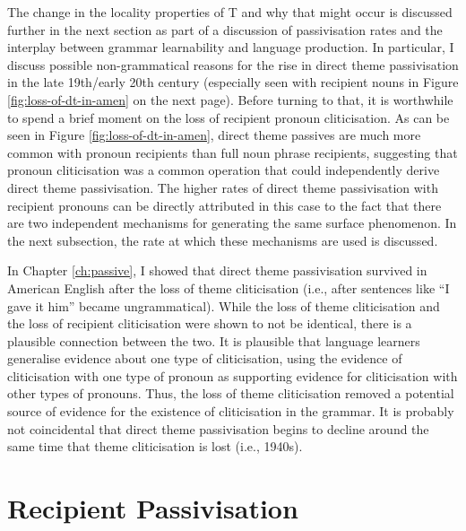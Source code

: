 	The change in the locality properties of T and why that might occur is discussed further in the next section as part of a discussion of passivisation rates and the interplay between grammar learnability and language production. In particular, I discuss possible non-grammatical reasons for the rise in direct theme passivisation in the late 19th/early 20th century (especially seen with recipient nouns in Figure \ref{fig:loss-of-dt-in-amen} on the next page). Before turning to that, it is worthwhile to spend a brief moment on the loss of recipient pronoun cliticisation. As can be seen in Figure \ref{fig:loss-of-dt-in-amen}, direct theme passives are much more common with pronoun recipients than full noun phrase recipients, suggesting that pronoun cliticisation was a common operation that could independently derive direct theme passivisation. The higher rates of direct theme passivisation with recipient pronouns can be directly attributed in this case to the fact that there are two independent mechanisms for generating the same surface phenomenon. In the next subsection, the rate at which these mechanisms are used is discussed.
	
	In Chapter \ref{ch:passive}, I showed that direct theme passivisation survived in American English after the loss of theme cliticisation (i.e., after sentences like ``I gave it him'' became ungrammatical). While the loss of theme cliticisation and the loss of recipient cliticisation were shown to not be identical, there is a plausible connection between the two. It is plausible that language learners generalise evidence about one type of cliticisation, using the evidence of cliticisation with one type of pronoun as supporting evidence for cliticisation with other types of pronouns. Thus, the loss of theme cliticisation removed a potential source of evidence for the existence of cliticisation in the grammar. It is probably not coincidental that direct theme passivisation begins to decline around the same time that theme cliticisation is lost (i.e., 1940s).

	\section{Recipient Passivisation}\label{sec:en-pas}

